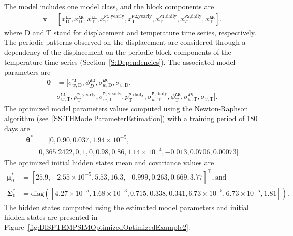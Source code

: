 The model includes one model class, and the block components are 
\begin{gather*}
\textbf{x}=[x^{\mathtt{LL}}_{\text{D}}, x^{\mathtt{AR}}_{\text{D}}, x^{\mathtt{LL}}_{\text{T}}, x^{\mathtt{P1}\text{,yearly}}_{\text{T}}, x^{\mathtt{P2}\text{,yearly}}_{\text{T}}, x^{\mathtt{P1}\text{,daily}}_{\text{T}} , x^{\mathtt{P2}\text{,daily}}_{T}, x^{\mathtt{AR}}_{\text{T}}].
\end{gather*}
where $\text{D}$ and $\text{T}$ stand for displacement and temperature time series, respectively.
The periodic patterns observed on the displacement are considered through a dependency of the displacement on the periodic block components of the temperature time series (Section~\ref{S:Dependencies}).
The associated model parameters are
\begin{align*}
\bm\theta & =[\sigma_{w, \text{D}}^{\mathtt{LL}}, \phi^{\mathtt{AR}}_{D}, \sigma_{w, \text{D}}^{\mathtt{AR}}, \sigma_{v, \text{D}},  \\
&  \sigma_{w, \text{T}}^{\mathtt{LL}},  p^{\mathtt{P}, \text{yearly}}_{\text{T}}, \sigma_{w, \text{T}}^{\mathtt{P}, \text{yearly}} , p^{\mathtt{P}, \text{daily}}_{\text{T}} , \sigma_{w, \text{T}}^{\mathtt{P}, \text{daily}}, \phi^{\mathtt{AR}}_{\text{T}}, \sigma_{w, \text{T}}^{\mathtt{AR}}, \sigma_{v, \text{T}}].
\end{align*}
The optimized model parameters values computed using the Newton-Raphson algorithm (see~\ref{SS:THModelParameterEstimation}) with a training period of 180 days are
\begin{align*}
 \bm\theta^{\text{*}}& =[0, 0.90, 0.037, 1.94\times10^{-5},  \\
 & 0, 365.2422, 0, 1, 0, 0.98, 0.86, 1.14\times10^{-4}, -0.013, 0.0706, 0.00073 ]
\end{align*}
The optimized initial hidden states mean and covariance values are 
\begin{align*}
\bm \mu^{*}_{0} & = [	25.9,-2.55\times10^{-5},5.53,16.3,-0.999,0.263,0.669,3.77 ]^{\intercal}, \text{and} \\
\bm\Sigma^{*}_{0} & = \text{diag}([4.27\times10^{-5},1.68\times10^{-3},0.715,0.338,0.341,6.73\times10^{-5},6.73\times10^{-5},1.81]).
 \end{align*}
The hidden states computed using the estimated model parameters and initial hidden states are presented in Figure~\ref{fig:DISPTEMPSIMOptimizedOptimizedExample2}.


